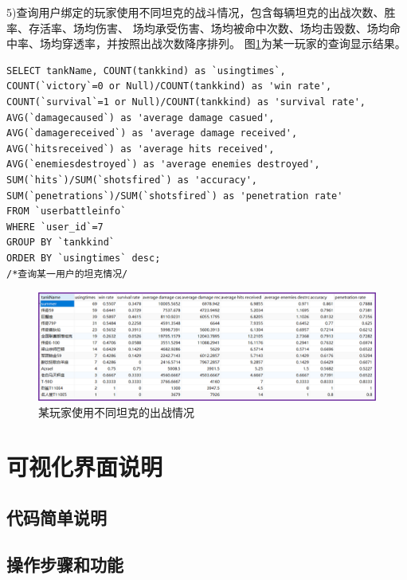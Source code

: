 \documentclass[UTF8, a4paper]{ctexart}
\begin{document}
5)查询用户绑定的玩家使用不同坦克的战斗情况，包含每辆坦克的出战次数、胜率、存活率、场均伤害、
场均承受伤害、场均被命中次数、场均击毁数、场均命中率、场均穿透率，并按照出战次数降序排列。
图\ref{fig:userresult}为某一玩家的查询显示结果。
\begin{lstlisting}[style=A]
SELECT tankName, COUNT(tankkind) as `usingtimes`, 
COUNT(`victory`=0 or Null)/COUNT(tankkind) as 'win rate',
COUNT(`survival`=1 or Null)/COUNT(tankkind) as 'survival rate', 
AVG(`damagecaused`) as 'average damage casued',
AVG(`damagereceived`) as 'average damage received', 
AVG(`hitsreceived`) as 'average hits received',
AVG(`enemiesdestroyed`) as 'average enemies destroyed',
SUM(`hits`)/SUM(`shotsfired`) as 'accuracy',
SUM(`penetrations`)/SUM(`shotsfired`) as 'penetration rate'
FROM `userbattleinfo`
WHERE `user_id`=7
GROUP BY `tankkind`
ORDER BY `usingtimes` desc;	
/*查询某一用户的坦克情况/
\end{lstlisting}
 \begin{figure}[h]
    \centering
    \includegraphics[width=1\textwidth]{userresult.png}
    \caption{某玩家使用不同坦克的出战情况}
    \label{fig:userresult}
  \end{figure}

\section{可视化界面说明}
\subsection{代码简单说明}

\subsection{操作步骤和功能}
\end{document}
